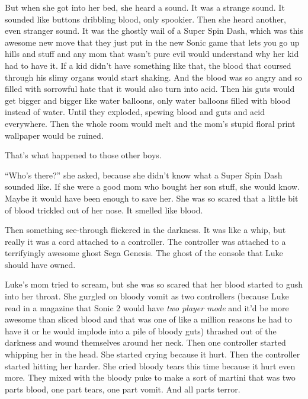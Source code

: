 But when she got into her bed, she heard a sound. It was a strange
sound. It sounded like buttons dribbling blood, only spookier. Then
she heard another, even stranger sound. It was the ghostly wail of
a Super Spin Dash, which was this awesome new move that they just
put in the new Sonic game that lets you go up hills and stuff and
any mom that wasn't pure evil would understand why her kid
had to have it. If a kid didn't have something like that, the
blood that coursed through his slimy organs would start shaking.
And the blood was so angry and so filled with sorrowful hate that
it would also turn into acid. Then his guts would get bigger and
bigger like water balloons, only water balloons filled with blood
instead of water. Until they exploded, spewing blood and guts and
acid everywhere. Then the whole room would melt and the mom's
stupid floral print wallpaper would be ruined.



That's what happened to those other boys.



``Who's there?'' she asked, because she
didn't know what a Super Spin Dash sounded like. If she were
a good mom who bought her son stuff, she would know. Maybe it would
have been enough to save her. She was so scared that a little bit
of blood trickled out of her nose. It smelled like blood.



Then something see-through flickered in the darkness. It was like a
whip, but really it was a cord attached to a controller. The
controller was attached to a terrifyingly awesome ghost Sega
Genesis. The ghost of the console that Luke should have
owned.



Luke's mom tried to scream, but she was so scared that her
blood started to gush into her throat. She gurgled on bloody vomit
as two controllers (because Luke read in a magazine that Sonic 2
would have {\em two player mode} and it'd be more awesome
than sliced blood and that was one of like a million reasons he had
to have it or he would implode into a pile of bloody guts) thrashed
out of the darkness and wound themselves around her neck. Then one
controller started whipping her in the head. She started crying
because it hurt. Then the controller started hitting her harder.
She cried bloody tears this time because it hurt even more. They
mixed with the bloody puke to make a sort of martini that was two
parts blood, one part tears, one part vomit. And all parts
terror.



